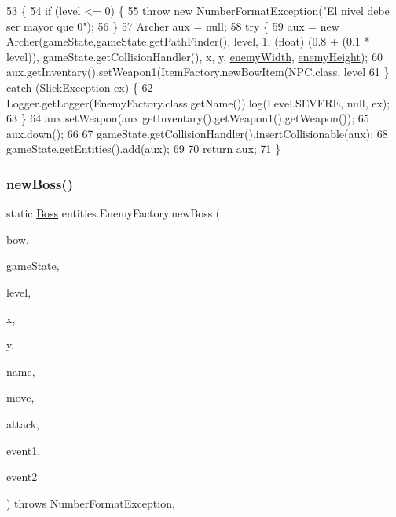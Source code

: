 \begin{DoxyCode}
53                                                                                                            
         \{
54         \textcolor{keywordflow}{if} (level <= 0) \{
55             \textcolor{keywordflow}{throw} \textcolor{keyword}{new} NumberFormatException(\textcolor{stringliteral}{"El nivel debe ser mayor que 0"});
56         \}
57         Archer aux = null;
58         \textcolor{keywordflow}{try} \{
59             aux = \textcolor{keyword}{new} Archer(gameState,gameState.getPathFinder(), level, 1, (float) (0.8 + (0.1 * level)), 
      gameState.getCollisionHandler(), x, y, \mbox{\hyperlink{classentities_1_1_enemy_factory_a3396d252fc506310c58e3a32494bbe36}{enemyWidth}}, \mbox{\hyperlink{classentities_1_1_enemy_factory_aa4632fbf138ccc9cc222e7437ccd8284}{enemyHeight}});
60             aux.getInventary().setWeapon1(ItemFactory.newBowItem(NPC.class, level %
61         \} \textcolor{keywordflow}{catch} (SlickException ex) \{
62             Logger.getLogger(EnemyFactory.class.getName()).log(Level.SEVERE, null, ex);
63         \}
64         aux.setWeapon(aux.getInventary().getWeapon1().getWeapon());
65         aux.down();
66 
67         gameState.getCollisionHandler().insertCollisionable(aux);
68         gameState.getEntities().add(aux);
69 
70         \textcolor{keywordflow}{return} aux;
71     \}
\end{DoxyCode}
\mbox{\label{classentities_1_1_enemy_factory_a0f1199be59b5f19063d3546aa1a26b51}} 
\subsubsection{\texorpdfstring{new\+Boss()}{newBoss()}}
{\footnotesize\ttfamily static \mbox{\hyperlink{classentities_1_1_boss}{Boss}} entities.\+Enemy\+Factory.\+new\+Boss (\begin{DoxyParamCaption}\item[{boolean}]{bow,  }\item[{\mbox{\hyperlink{classstates_1_1_game_state}{Game\+State}}}]{game\+State,  }\item[{int}]{level,  }\item[{int}]{x,  }\item[{int}]{y,  }\item[{String}]{name,  }\item[{\mbox{\hyperlink{classorg_1_1newdawn_1_1slick_1_1_image}{Image}}}]{move,  }\item[{\mbox{\hyperlink{classorg_1_1newdawn_1_1slick_1_1_image}{Image}}}]{attack,  }\item[{\mbox{\hyperlink{interfaceentities_1_1_event_launcher}{Event\+Launcher}}}]{event1,  }\item[{\mbox{\hyperlink{interfaceentities_1_1_event_launcher}{Event\+Launcher}}}]{event2 }\end{DoxyParamCaption}) throws Number\+Format\+Exception\hspace{0.3cm}{\ttfamily [inline]}, {\ttfamily [static]}}


